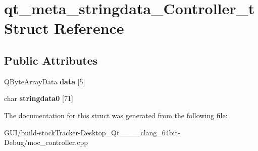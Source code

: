 \hypertarget{structqt__meta__stringdata___controller__t}{}\section{qt\+\_\+meta\+\_\+stringdata\+\_\+\+Controller\+\_\+t Struct Reference}
\label{structqt__meta__stringdata___controller__t}
\subsection*{Public Attributes}
\begin{DoxyCompactItemize}
\item 
\mbox{\label{structqt__meta__stringdata___controller__t_a1d01ecc044d513de3ad518f8db5e9739}} 
Q\+Byte\+Array\+Data {\bfseries data} \mbox{[}5\mbox{]}
\item 
\mbox{\label{structqt__meta__stringdata___controller__t_a54dd84322c744b9246d34dacee5ee786}} 
char {\bfseries stringdata0} \mbox{[}71\mbox{]}
\end{DoxyCompactItemize}


The documentation for this struct was generated from the following file\+:\begin{DoxyCompactItemize}
\item 
G\+U\+I/build-\/stock\+Tracker-\/\+Desktop\+\_\+\+Qt\+\_\+\_\+\_\+\_\+clang\+\_\+64bit-\/\+Debug/moc\+\_\+controller.\+cpp\end{DoxyCompactItemize}

